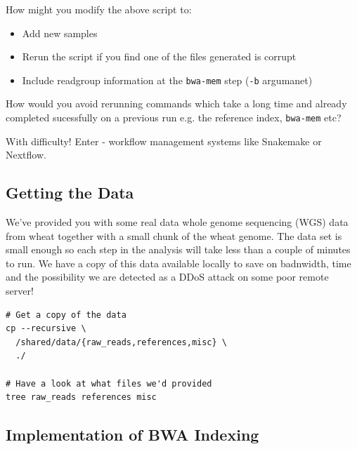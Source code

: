 \begin{questions}

How might you modify the above script to:

\begin{itemize}
  \item Add new samples
  \item Rerun the script if you find one of the files generated is corrupt
  \item Include readgroup information at the \texttt{bwa-mem} step (\texttt{-b} argumanet)
\end{itemize}

How would you avoid rerunning commands which take a long time and already completed sucessfully
on a previous run e.g. the reference index, \texttt{bwa-mem} etc?

\begin{answer}

With difficulty!
Enter - workflow management systems like Snakemake or Nextflow.

\end{answer}

\end{questions}

\subsection{Getting the Data}

We've provided you with some real data whole genome sequencing (WGS) data from wheat together with a small chunk of the wheat genome.
The data set is small enough so each step in the analysis will take less than a couple of minutes to run. We have a copy of this data
available locally to save on badnwidth, time and the possibility we are detected as a DDoS attack on some poor remote server!

\begin{lstlisting}
# Get a copy of the data
cp --recursive \
  /shared/data/{raw_reads,references,misc} \
  ./

# Have a look at what files we'd provided
tree raw_reads references misc
\end{lstlisting}

\subsection{Implementation of BWA Indexing}

